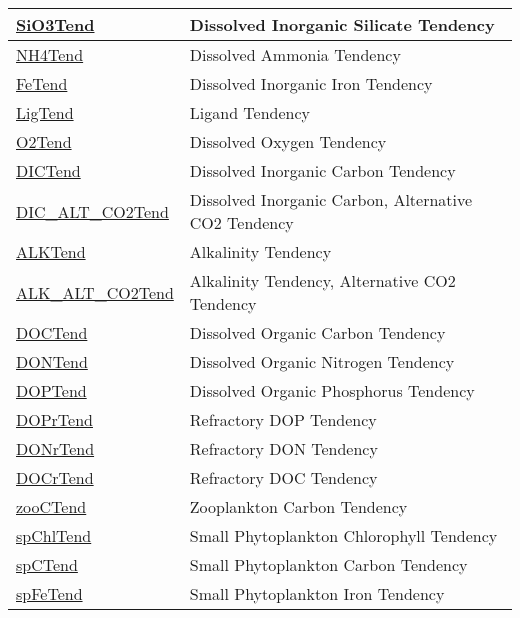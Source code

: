 {\begin{center}
\begin{longtable}{| p{2.0in} | p{4.0in} |}
    \hline
    \hyperref[subsec:var_sec_tend_SiO3Tend]{SiO3Tend} & Dissolved Inorganic Silicate Tendency \\
    \hline
    \hyperref[subsec:var_sec_tend_NH4Tend]{NH4Tend} & Dissolved Ammonia Tendency \\
    \hline
    \hyperref[subsec:var_sec_tend_FeTend]{FeTend} & Dissolved Inorganic Iron Tendency \\
    \hline
    \hyperref[subsec:var_sec_tend_LigTend]{LigTend} & Ligand Tendency \\
    \hline
    \hyperref[subsec:var_sec_tend_O2Tend]{O2Tend} & Dissolved Oxygen Tendency \\
    \hline
    \hyperref[subsec:var_sec_tend_DICTend]{DICTend} & Dissolved Inorganic Carbon Tendency \\
    \hline
    \hyperref[subsec:var_sec_tend_DIC_ALT_CO2Tend]{DIC\_ALT\_CO2Tend} & Dissolved Inorganic Carbon, Alternative CO2 Tendency \\
    \hline
    \hyperref[subsec:var_sec_tend_ALKTend]{ALKTend} & Alkalinity Tendency \\
    \hline
    \hyperref[subsec:var_sec_tend_ALK_ALT_CO2Tend]{ALK\_ALT\_CO2Tend} & Alkalinity Tendency, Alternative CO2 Tendency \\
    \hline
    \hyperref[subsec:var_sec_tend_DOCTend]{DOCTend} & Dissolved Organic Carbon Tendency \\
    \hline
    \hyperref[subsec:var_sec_tend_DONTend]{DONTend} & Dissolved Organic Nitrogen Tendency \\
    \hline
    \hyperref[subsec:var_sec_tend_DOPTend]{DOPTend} & Dissolved Organic Phosphorus Tendency \\
    \hline
    \hyperref[subsec:var_sec_tend_DOPrTend]{DOPrTend} & Refractory DOP Tendency \\
    \hline
    \hyperref[subsec:var_sec_tend_DONrTend]{DONrTend} & Refractory DON Tendency \\
    \hline
    \hyperref[subsec:var_sec_tend_DOCrTend]{DOCrTend} & Refractory DOC Tendency \\
    \hline
    \hyperref[subsec:var_sec_tend_zooCTend]{zooCTend} & Zooplankton Carbon Tendency \\
    \hline
    \hyperref[subsec:var_sec_tend_spChlTend]{spChlTend} & Small Phytoplankton Chlorophyll Tendency \\
    \hline
    \hyperref[subsec:var_sec_tend_spCTend]{spCTend} & Small Phytoplankton Carbon Tendency \\
    \hline
    \hyperref[subsec:var_sec_tend_spFeTend]{spFeTend} & Small Phytoplankton Iron Tendency \\

\end{longtable}
\end{center}}
